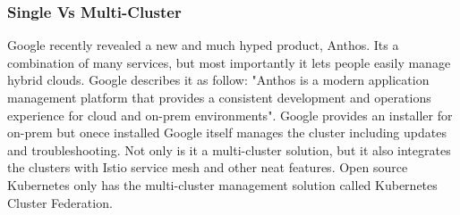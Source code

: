 \subsubsection{Single Vs Multi-Cluster}
Google recently revealed a new and much hyped product, Anthos\cite{TechnicalAnthosGoogle66:online}. Its a combination of many services, but most importantly it lets people easily manage hybrid clouds. Google describes it as follow: "Anthos is a modern application management platform that provides a consistent development and operations experience for cloud and on-prem environments"\cite{TechnicalAnthosGoogle66:online}. Google provides an installer for on-prem but onece installed Google itself manages the cluster including updates and troubleshooting. Not only is it a multi-cluster solution, but it also integrates the clusters with Istio service mesh and other neat features. Open source Kubernetes only has the multi-cluster management solution called Kubernetes Cluster Federation.


